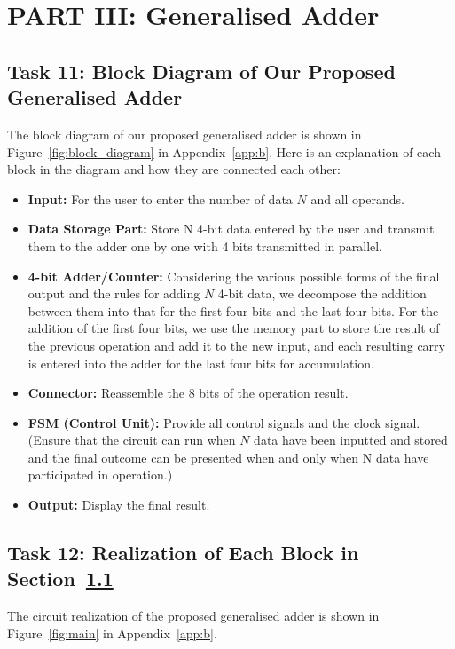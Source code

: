 \documentclass[11pt]{article}
\begin{document}
\section{PART III: Generalised Adder}

\subsection{Task 11: Block Diagram of Our Proposed Generalised Adder}
\label{sec:task11}

The block diagram of our proposed generalised adder is shown in Figure~\ref{fig:block_diagram} in Appendix~\ref{app:b}. Here is an explanation of each block in the diagram and how they are connected each other:

\begin{itemize}
	\item \textbf{Input:} For the user to enter the number of data $N$ and all operands.
	\item \textbf{Data Storage Part:} Store N 4-bit data entered by the user and transmit them to the adder one by one with 4 bits transmitted in parallel.
	\item \textbf{4-bit Adder/Counter:} Considering the various possible forms of the final output and the rules for adding $N$ 4-bit data, we decompose the addition between them into that for the first four bits and the last four bits. For the addition of the first four bits, we use the memory part to store the result of the previous operation and add it to the new input, and each resulting carry is entered into the adder for the last four bits for accumulation.
	\item \textbf{Connector:} Reassemble the 8 bits of the operation result.
	\item \textbf{FSM (Control Unit):} Provide all control signals and the clock signal. (Ensure that the circuit can run when $N$ data have been inputted and stored and the final outcome can be presented when and only when N data have participated in operation.)
	\item \textbf{Output:} Display the final result.
\end{itemize}

\subsection{Task 12: Realization of Each Block in Section~\ref{sec:task11}}

The circuit realization of the proposed generalised adder is shown in Figure~\ref{fig:main} in Appendix~\ref{app:b}.
\end{document}
